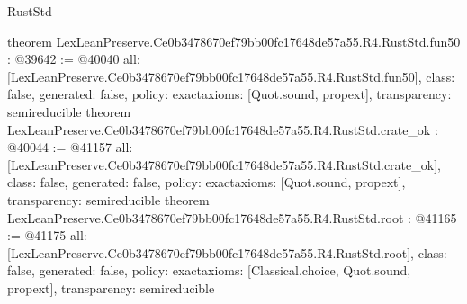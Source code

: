 \begin{lexlean}{RustStd}
\begin{coremodule}
{}
theorem LexLeanPreserve.Ce0b3478670ef79bb00fc17648de57a55.R4.RustStd.fun50 : @39642 := @40040 {
  all: [LexLeanPreserve.Ce0b3478670ef79bb00fc17648de57a55.R4.RustStd.fun50],
  class: false,
  generated: false,
  policy: exact{axioms: [Quot.sound, propext]},
  transparency: semireducible
}
theorem LexLeanPreserve.Ce0b3478670ef79bb00fc17648de57a55.R4.RustStd.crate_ok : @40044 := @41157 {
  all: [LexLeanPreserve.Ce0b3478670ef79bb00fc17648de57a55.R4.RustStd.crate_ok],
  class: false,
  generated: false,
  policy: exact{axioms: [Quot.sound, propext]},
  transparency: semireducible
}
theorem LexLeanPreserve.Ce0b3478670ef79bb00fc17648de57a55.R4.RustStd.root : @41165 := @41175 {
  all: [LexLeanPreserve.Ce0b3478670ef79bb00fc17648de57a55.R4.RustStd.root],
  class: false,
  generated: false,
  policy: exact{axioms: [Classical.choice, Quot.sound, propext]},
  transparency: semireducible
}


\end{coremodule}
\end{lexlean}

